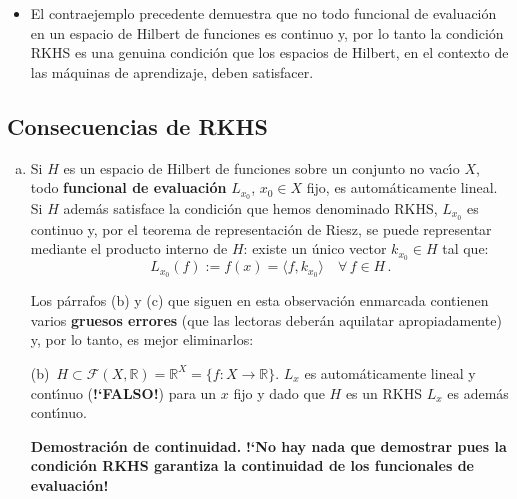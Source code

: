 \begin{enumerate}
\begin{itemize}
\item
El contraejemplo precedente demuestra que no todo funcional de
evaluaci\'on en un espacio de Hilbert de funciones es continuo y,
por lo tanto la condici\'on RKHS es una genuina condici\'on que
los espacios de Hilbert, en el contexto de las m\'aquinas de
aprendizaje, deben satisfacer.
\end{itemize}
\end{enumerate}





\subsection{Consecuencias de RKHS}

\begin{enumerate}[(a)]
\item
Si $H$ es un espacio de Hilbert de funciones sobre un conjunto no
vac\'\i o $X$, todo {\color{red} \bf funcional de evaluaci\'on}
$L_{x_0}$, $x_0\in X$ fijo, es autom\'aticamente lineal.
Si $H$ adem\'as satisface la condici\'on que hemos denominado RKHS,
$L_{x_0}$ es continuo y, por el teorema de representaci\'on de Riesz,
se puede representar mediante el producto interno de $H$:
existe un \'unico vector $k_{x_0}\in H$ tal que:
\begin{equation*}
L_{x_0}(f):= f(x)= \langle f,k_{x_0}\rangle\quad\forall\,f\in H\,.
\end{equation*}

\begin{myremark}
Los p\'arrafos (b) y (c) que siguen en esta observaci\'on enmarcada
contienen varios {\bf gruesos errores} (que las lectoras deber\'an
aquilatar apropiadamente) y, por lo tanto, es mejor eliminarlos:

(b)\ $H\subset\mathcal{F}(X,\mathbb{R})
=\mathbb{R}^X=\{f:X \rightarrow \mathbb{R}\}$. 
$L_x$ es autom\'aticamente lineal y cont\'\i nuo ({\bf !`FALSO!})
para un $x$ fijo y dado que $H$ es un RKHS $L_x$ es adem\'as cont\'\i nuo.

\smallskip\noindent
\textbf{Demostraci\'on de continuidad.}\quad
{\bf !`No hay nada que demostrar pues la condici\'on RKHS garantiza
la continuidad de los funcionales de evaluaci\'on!}


\end{myremark}
\end{enumerate}
